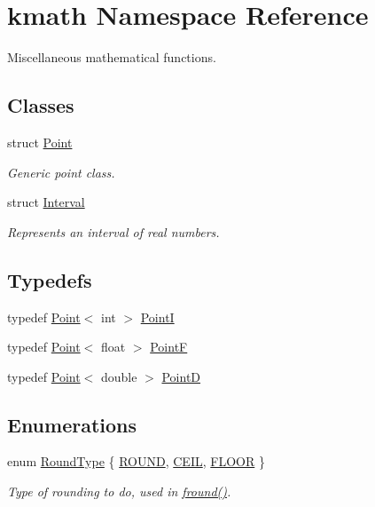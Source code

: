 \hypertarget{namespacekmath}{\section{kmath Namespace Reference}
\label{namespacekmath}
}


Miscellaneous mathematical functions.  


\subsection*{Classes}
\begin{DoxyCompactItemize}
\item 
struct \hyperlink{structkmath_1_1_point}{Point}
\begin{DoxyCompactList}\small\item\em Generic point class. \end{DoxyCompactList}\item 
struct \hyperlink{structkmath_1_1_interval}{Interval}
\begin{DoxyCompactList}\small\item\em Represents an interval of real numbers. \end{DoxyCompactList}\end{DoxyCompactItemize}
\subsection*{Typedefs}
\begin{DoxyCompactItemize}
\item 
typedef \hyperlink{structkmath_1_1_point}{Point}$<$ int $>$ \hyperlink{namespacekmath_afaf3fde3b20c9932e144eb48e736cad9}{Point\-I}
\item 
typedef \hyperlink{structkmath_1_1_point}{Point}$<$ float $>$ \hyperlink{namespacekmath_ad80aa80b21a1aeadbd484a0fc56f4e95}{Point\-F}
\item 
typedef \hyperlink{structkmath_1_1_point}{Point}$<$ double $>$ \hyperlink{namespacekmath_aad2e627ee7da1b98c2c516f20ed5b7e3}{Point\-D}
\end{DoxyCompactItemize}
\subsection*{Enumerations}
\begin{DoxyCompactItemize}
\item 
enum \hyperlink{namespacekmath_a1e00ae34fe8ed9548870fc759ea82609}{Round\-Type} \{ \hyperlink{namespacekmath_a1e00ae34fe8ed9548870fc759ea82609ae04658d947a7879a4502f837c286f1ac}{R\-O\-U\-N\-D}, 
\hyperlink{namespacekmath_a1e00ae34fe8ed9548870fc759ea82609a449ece60a17b2668fdb165fd8740dbdf}{C\-E\-I\-L}, 
\hyperlink{namespacekmath_a1e00ae34fe8ed9548870fc759ea82609a8f67a6160bf7ac646e9b1bb6ef1a56c1}{F\-L\-O\-O\-R}
 \}
\begin{DoxyCompactList}\small\item\em Type of rounding to do, used in \hyperlink{namespacekmath_aa18b5fc52315b0ca7717a52bdf152ee6}{fround()}. \end{DoxyCompactList}\end{DoxyCompactItemize}
